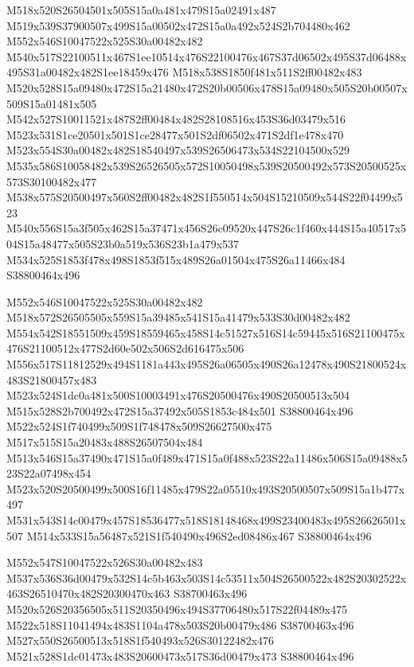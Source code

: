 \documentclass{article}
\begin{document}
\begin{multicols}{2}
M518x520S26504501x505S15a0a481x479S15a02491x487 M519x539S37900507x499S15a00502x472S15a0a492x524S2b704480x462 M552x546S10047522x525S30a00482x482 M540x517S22100511x467S1ee10514x476S22100476x467S37d06502x495S37d06488x495S31a00482x482S1ee18459x476 M518x538S1850f481x511S2ff00482x483 M520x528S15a09480x472S15a21480x472S20b00506x478S15a09480x505S20b00507x509S15a01481x505 M542x527S10011521x487S2ff00484x482S28108516x453S36d03479x516 M523x531S1ce20501x501S1ce28477x501S2df06502x471S2df1e478x470 M523x554S30a00482x482S18540497x539S26506473x534S22104500x529 M535x586S10058482x539S26526505x572S10050498x539S20500492x573S20500525x573S30100482x477 M538x575S20500497x560S2ff00482x482S1f550514x504S15210509x544S22f04499x523 M540x556S15a3f505x462S15a37471x456S26c09520x447S26c1f460x444S15a40517x504S15a48477x505S23b0a519x536S23b1a479x537 M534x525S1853f478x498S1853f515x489S26a01504x475S26a11466x484 S38800464x496

M552x546S10047522x525S30a00482x482 M518x572S26505505x559S15a39485x541S15a41479x533S30d00482x482 M554x542S18551509x459S18559465x458S14c51527x516S14c59445x516S21100475x476S21100512x477S2d60e502x506S2d616475x506 M556x517S11812529x494S1181a443x495S26a06505x490S26a12478x490S21800524x483S21800457x483 M523x524S1dc0a481x500S10003491x476S20500476x490S20500513x504 M515x528S2b700492x472S15a37492x505S1853c484x501 S38800464x496 M522x524S1f740499x509S1f748478x509S26627500x475 M517x515S15a20483x488S26507504x484 M513x546S15a37490x471S15a0f489x471S15a0f488x523S22a11486x506S15a09488x523S22a07498x454 M523x520S20500499x500S16f11485x479S22a05510x493S20500507x509S15a1b477x497 M531x543S14c00479x457S18536477x518S18148468x499S23400483x495S26626501x507 M514x533S15a56487x521S1f540490x496S2ed08486x467 S38800464x496

M552x547S10047522x526S30a00482x483 M537x536S36d00479x532S14c5b463x503S14c53511x504S26500522x482S20302522x463S26510470x482S20300470x463 S38700463x496 M520x526S20356505x511S20350496x494S37706480x517S22f04489x475 M522x518S11041494x483S1104a478x503S20b00479x486 S38700463x496 M527x550S26500513x518S1f540493x526S30122482x476 M521x528S1dc01473x483S20600473x517S36d00479x473 S38800464x496



\end{multicols}
\end{document}
